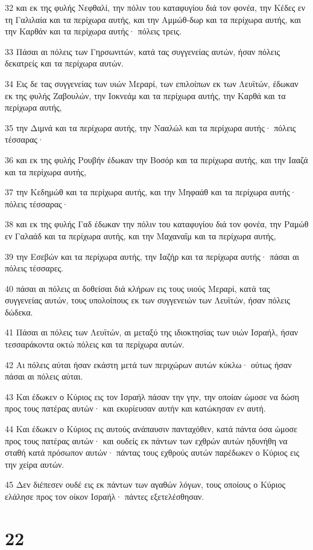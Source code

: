 \par 32 και εκ της φυλής Νεφθαλί, την πόλιν του καταφυγίου διά τον φονέα, την Κέδες εν τη Γαλιλαία και τα περίχωρα αυτής, και την Αμμώθ-δωρ και τα περίχωρα αυτής, και την Καρθάν και τα περίχωρα αυτής· πόλεις τρεις.
\par 33 Πάσαι αι πόλεις των Γηρσωνιτών, κατά τας συγγενείας αυτών, ήσαν πόλεις δεκατρείς και τα περίχωρα αυτών.
\par 34 Εις δε τας συγγενείας των υιών Μεραρί, των επιλοίπων εκ των Λευϊτών, έδωκαν εκ της φυλής Ζαβουλών, την Ιοκνεάμ και τα περίχωρα αυτής, την Καρθά και τα περίχωρα αυτής,
\par 35 την Διμνά και τα περίχωρα αυτής, την Νααλώλ και τα περίχωρα αυτής· πόλεις τέσσαρας·
\par 36 και εκ της φυλής Ρουβήν έδωκαν την Βοσόρ και τα περίχωρα αυτής, και την Ιααζά και τα περίχωρα αυτής,
\par 37 την Κεδημώθ και τα περίχωρα αυτής, και την Μηφαάθ και τα περίχωρα αυτής· πόλεις τέσσαρας·
\par 38 και εκ της φυλής Γαδ έδωκαν την πόλιν του καταφυγίου διά τον φονέα, την Ραμώθ εν Γαλαάδ και τα περίχωρα αυτής, και την Μαχαναΐμ και τα περίχωρα αυτής,
\par 39 την Εσεβών και τα περίχωρα αυτής, την Ιαζήρ και τα περίχωρα αυτής· πάσαι αι πόλεις τέσσαρες.
\par 40 πάσαι αι πόλεις αι δοθείσαι διά κλήρων εις τους υιούς Μεραρί, κατά τας συγγενείας αυτών, τους υπολοίπους εκ των συγγενειών των Λευϊτών, ήσαν πόλεις δώδεκα.
\par 41 Πάσαι αι πόλεις των Λευϊτών, αι μεταξύ της ιδιοκτησίας των υιών Ισραήλ, ήσαν τεσσαράκοντα οκτώ πόλεις και τα περίχωρα αυτών.
\par 42 Αι πόλεις αύται ήσαν εκάστη μετά των περιχώρων αυτών κύκλω· ούτως ήσαν πάσαι αι πόλεις αύται.
\par 43 Και έδωκεν ο Κύριος εις τον Ισραήλ πάσαν την γην, την οποίαν ώμοσε να δώση προς τους πατέρας αυτών· και εκυρίευσαν αυτήν και κατώκησαν εν αυτή.
\par 44 Και έδωκεν ο Κύριος εις αυτούς ανάπαυσιν πανταχόθεν, κατά πάντα όσα ώμοσε προς τους πατέρας αυτών· και ουδείς εκ πάντων των εχθρών αυτών ηδυνήθη να σταθή κατά πρόσωπον αυτών· πάντας τους εχθρούς αυτών παρέδωκεν ο Κύριος εις την χείρα αυτών.
\par 45 Δεν διέπεσεν ουδέ εις εκ πάντων των αγαθών λόγων, τους οποίους ο Κύριος ελάλησε προς τον οίκον Ισραήλ· πάντες εξετελέσθησαν.

\chapter{22}

